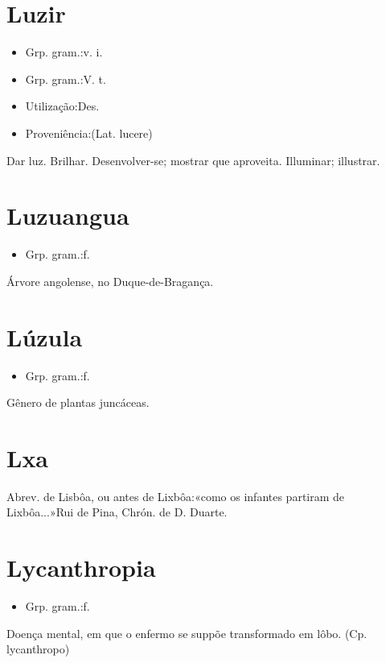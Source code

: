 \section{Luzir}
\begin{itemize}
\item {Grp. gram.:v. i.}
\end{itemize}
\begin{itemize}
\item {Grp. gram.:V. t.}
\end{itemize}
\begin{itemize}
\item {Utilização:Des.}
\end{itemize}
\begin{itemize}
\item {Proveniência:(Lat. \textunderscore lucere\textunderscore )}
\end{itemize}
Dar luz.
Brilhar.
Desenvolver-se; mostrar que aproveita.
Illuminar; illustrar.
\section{Luzuangua}
\begin{itemize}
\item {Grp. gram.:f.}
\end{itemize}
Árvore angolense, no Duque-de-Bragança.
\section{Lúzula}
\begin{itemize}
\item {Grp. gram.:f.}
\end{itemize}
Gênero de plantas juncáceas.
\section{Lxa}
Abrev. de \textunderscore Lisbôa\textunderscore , ou antes de \textunderscore Lixbôa\textunderscore :«\textunderscore como os infantes partiram de Lixbôa...\textunderscore »Rui de Pina, \textunderscore Chrón. de D. Duarte\textunderscore .
\section{Lycanthropia}
\begin{itemize}
\item {Grp. gram.:f.}
\end{itemize}
Doença mental, em que o enfermo se suppõe transformado em lôbo.
(Cp. \textunderscore lycanthropo\textunderscore )
